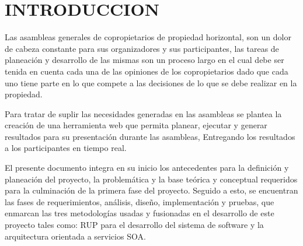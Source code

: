
\section{INTRODUCCION}

\vspace{5mm}

Las asambleas generales de copropietarios de propiedad horizontal, son un dolor de cabeza constante para sus organizadores y sus participantes, las tareas de planeación y desarrollo de las mismas son un proceso largo en el cual debe ser tenida en cuenta cada una de las opiniones de los copropietarios dado que cada uno tiene parte en lo que compete a las decisiones de lo que se debe realizar en la propiedad.

\vspace{5mm}

Para tratar de suplir las necesidades generadas en las asambleas se plantea la creación de una herramienta web que permita planear, ejecutar y generar resultados para su presentación durante las asambleas, Entregando los resultados a los participantes en tiempo real.

\vspace{5mm}

El presente documento integra en su inicio los antecedentes para la definición y planeación del proyecto, la problemática y la base teórica y conceptual requeridos para la culminación de la primera fase del proyecto. Seguido a esto, se encuentran las fases de requerimientos, análisis, diseño, implementación y pruebas, que enmarcan las tres metodologías usadas y fusionadas en el desarrollo de este proyecto tales como: RUP para el desarrollo del sistema de software y la arquitectura orientada a servicios SOA.
\newpage